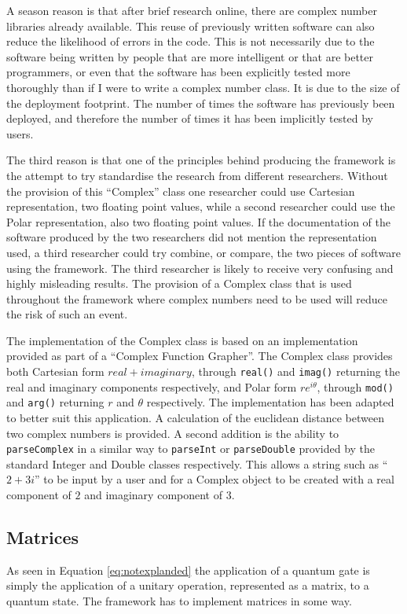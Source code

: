 A season reason is that after brief research online, there are complex number libraries already available.
This reuse of previously written software can also reduce the likelihood of errors in the code.
This is not necessarily due to the software being written by people that are more intelligent or that are better programmers, or even that the software has been explicitly tested more thoroughly than if I were to write a complex number class.
It is due to the size of the deployment footprint.
The number of times the software has previously been deployed, and therefore the number of times it has been implicitly tested by users.

The third reason is that one of the principles behind producing the framework is the attempt to try standardise the research from different researchers.
Without the provision of this ``Complex'' class one researcher could use Cartesian representation, two floating point values, while a second researcher could use the Polar representation, also two floating point values.
If the documentation of the software produced by the two researchers did not mention the representation used, a third researcher could try combine, or compare, the two pieces of software using the framework.
The third researcher is likely to receive very confusing and highly misleading results.
The provision of a Complex class that is used throughout the framework where complex numbers need to be used will reduce the risk of such an event.

The implementation of the Complex class is based on an implementation provided as part of a ``Complex Function Grapher''\cite{compimp}.
The Complex class provides both Cartesian form $real + imaginary$, through \lstinline{real()} and \lstinline{imag()} returning the real and imaginary components respectively, and Polar form $re^{i\theta}$, through \lstinline{mod()} and \lstinline{arg()} returning $r$ and $\theta$ respectively.
The implementation has been adapted to better suit this application.
A calculation of the euclidean distance between two complex numbers is provided.
A second addition is the ability to \lstinline{parseComplex} in a similar way to \lstinline{parseInt} or \lstinline{parseDouble} provided by the standard Integer and Double classes respectively.
This allows a string such as ``$2+3i$'' to be input by a user and for a Complex object to be created with a real component of $2$ and imaginary component of $3$.

\subsection{Matrices}
As seen in Equation \ref{eq:notexplanded} the application of a quantum gate is simply the application of a unitary operation, represented as a matrix, to a quantum state.
The framework has to implement matrices in some way.

